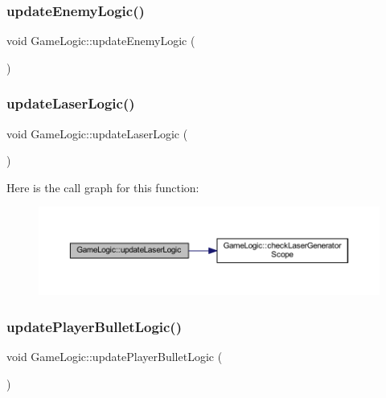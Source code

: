 \subsubsection{\texorpdfstring{update\+Enemy\+Logic()}{updateEnemyLogic()}}
{\footnotesize\ttfamily void Game\+Logic\+::update\+Enemy\+Logic (\begin{DoxyParamCaption}{ }\end{DoxyParamCaption})}

\mbox{\label{class_game_logic_ae7b71b5f335308748366385de5c0d88a}} 
\subsubsection{\texorpdfstring{update\+Laser\+Logic()}{updateLaserLogic()}}
{\footnotesize\ttfamily void Game\+Logic\+::update\+Laser\+Logic (\begin{DoxyParamCaption}{ }\end{DoxyParamCaption})}

Here is the call graph for this function\+:
\nopagebreak
\begin{figure}[H]
\begin{center}
\leavevmode
\includegraphics[width=350pt]{class_game_logic_ae7b71b5f335308748366385de5c0d88a_cgraph}
\end{center}
\end{figure}
\mbox{\label{class_game_logic_abe02a85cda082eea7d0dc758d8fe3082}} 
\subsubsection{\texorpdfstring{update\+Player\+Bullet\+Logic()}{updatePlayerBulletLogic()}}
{\footnotesize\ttfamily void Game\+Logic\+::update\+Player\+Bullet\+Logic (\begin{DoxyParamCaption}{ }\end{DoxyParamCaption})}

